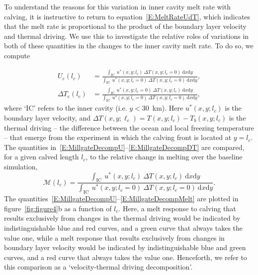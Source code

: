 \documentclass[draft]{agujournal2019}
\begin{document}
To understand the reasons for this variation in inner cavity melt rate with calving, it is instructive to return to equation~\eqref{E:MeltRateUdT}, which indicates that the melt rate is proportional to the product of the boundary layer velocity and thermal driving. We use this to investigate the relative roles of variations in both of these quantities in the changes to the inner cavity melt rate. To do so, we compute~\cite{Millgate2013JGROceans}

\begin{align}
  U_{e}(l_c) &=  \frac{\int_{\text{IC}}~u^*(x,y; l_c)~\Delta T(x,y;l_c = 0)~\mathrm{d}x\mathrm{d}y}{\int_{\text{IC}}~ u^*(x,y; l_c = 0)~\Delta T(x,y;l_c = 0)~\mathrm{d}x\mathrm{d}y}, \label{E:MillgateDecompU}\\ \Delta T_{e}(l_c) &=  \frac{\int_{\text{IC}}~u^*(x,y; l_c=0)~\Delta T(x,y;l_c)~\mathrm{d}x\mathrm{d}y}{\int_{\text{IC}}~ u^*(x,y; l_c = 0)~\Delta T(x,y;l_c = 0)~\mathrm{d}x\mathrm{d}y}, \label{E:MillgateDecompDT}
\end{align}
where `IC' refers to the inner cavity (i.e. $y < 30$~km). Here $u^*(x,y;l_c)$ is the boundary layer velocity, and $\Delta T(x,y;\ell_c) = T(x,y;l_c) - T_b(x,y;l_c)$ is the thermal driving -- the difference between the ocean and local freezing temperature -- that emerge from the experiment in which the calving front is located at $y = l_c$. The quantities in~\eqref{E:MillgateDecompU}--\eqref{E:MillgateDecompDT} are compared, for a given calved length $l_c$, to the relative change in melting over the baseline simulation,
 \begin{equation}\label{E:MillgateDecompMelt}
   \mathcal{M}(l_c) =  \frac{\int_{\text{IC}}~u^*(x,y; l_c)~\Delta T(x,y;l_c)~\mathrm{d}x\mathrm{d}y}{\int_{\text{IC}}~ u^*(x,y; l_c = 0)~\Delta T(x,y;l_c = 0)~\mathrm{d}x\mathrm{d}y}.
 \end{equation}
The quantities~\eqref{E:MillgateDecompU}--\eqref{E:MillgateDecompMelt} are plotted in figure~\ref{fig:figure4}b as a function of $l_c$.  Here, a melt response to calving that results exclusively from changes in the thermal driving would be indicated by indistinguishable blue and red curves, and a green curve that always takes the value one, while a melt response that results exclusively from changes in boundary layer velocity would be indicated by indistinguishable blue and green curves, and a red curve that always takes the value one. Henceforth, we refer to this comparison as a `velocity-thermal driving decomposition'. %
\end{document}
